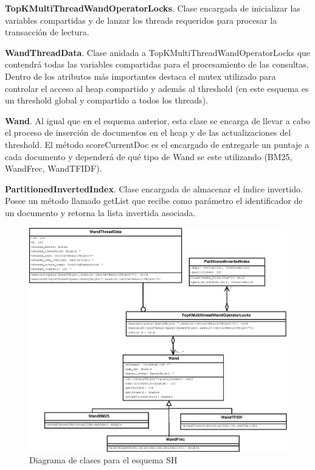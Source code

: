 \begin{list}{}{}
	\item \textbf{TopKMultiThreadWandOperatorLocks}. Clase encargada de inicializar las variables compartidas y de lanzar los threads requeridos para procesar la transacción de lectura.
	
	\item \textbf{WandThreadData}. Clase anidada a TopKMultiThreadWandOperatorLocks que contendrá todas las variables compartidas para el procesamiento de las consultas. Dentro de los atributos más importantes destaca el mutex utilizado para controlar el acceso al heap compartido y además al threshold (en este esquema es un threshold global y compartido a todos los threads).
	
	\item \textbf{Wand}. Al igual que en el esquema anterior, esta clase se encarga de llevar a cabo el proceso de inserción de documentos en el heap y de las actualizaciones del threshold. El método scoreCurrentDoc es el encargado de entregarle un puntaje a cada documento y dependerá de qué tipo de Wand se este utilizando (BM25, WandFrec, WandTFIDF). 

	\item \textbf{PartitionedInvertedIndex}. Clase encargada de almacenar el índice invertido. Posee un método llamado getList que recibe como parámetro el identificador de un documento y retorna la lista invertida asociada. 

\end{list}

\begin{figure}[!ht]
\centering
\includegraphics[scale=.75]{images/TopKMultiThreadWandOperatorLocks.eps}
\caption{Diagrama de clases para el esquema SH}
\label{fig:TopKMultiThreadWandOperatorLocks}
\end{figure}




